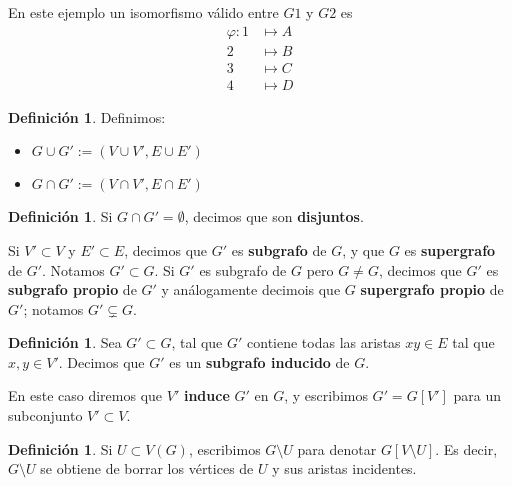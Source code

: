 \documentclass[12pt]{report}
\theoremstyle{plain}
\theoremstyle{definition}
\newtheorem{definition}[theorem]{Definición}
\begin{document}
En este ejemplo un isomorfismo válido entre $G1$ y $G2$ es
\begin{align*}
\varphi : 1 &\mapsto A \\
        2 &\mapsto B \\
        3 &\mapsto C \\
        4 &\mapsto D
\end{align*}


\begin{definition}
Definimos:
\begin{itemize}
\item $G \cup G' := (V \cup V', E \cup E')$
\item $G \cap G' := (V \cap V' , E \cap E')$
\end{itemize}
\end{definition}


\begin{definition}
Si $G \cap G' = \emptyset$, decimos que son \textbf{disjuntos}.

Si $V' \subset V$ y $E' \subset E$, decimos que $G'$ es \textbf{subgrafo} de $G$, y que $G$ es \textbf{supergrafo} de $G'$. Notamos $G' \subset G$. Si $G'$ es subgrafo de $G$ pero $G \neq G$, decimos que $G'$ es \textbf{subgrafo propio} de $G'$ y análogamente decimois que $G$ \textbf{supergrafo propio} de $G'$; notamos $G' \subsetneq G$.
\end{definition}

\begin{definition}
Sea $G' \subset G$, tal que $G'$ contiene todas las aristas $xy \in E$ tal que $x,y \in V'$. Decimos que $G'$ es un \textbf{subgrafo inducido} de $G$.

En este caso diremos que $V'$ \textbf{induce} $G'$ en $G$, y escribimos $G' = G[V']$ para un subconjunto $V' \subset V$.
\end{definition}









\begin{definition}
Si $U \subset V(G)$, escribimos $G \setminus U$ para denotar $G[V \setminus U]$. Es decir, $G \setminus U$ se obtiene de borrar los vértices de $U$ y sus aristas incidentes.
\end{definition}
\end{document}
